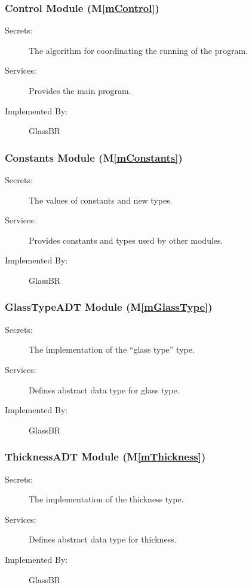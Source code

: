 \documentclass[12pt]{article}
\newcommand{\mref}[1]{M\ref{#1}}
\newcommand{\progname}{GlassBR}
\begin{document}
\subsubsection{Control Module (\mref{mControl})}

\begin{description}
\item[Secrets:] The algorithm for coordinating the running of the program.
\item[Services:] Provides the main program.
\item[Implemented By:] \progname{}
\end{description}

\subsubsection{Constants Module (\mref{mConstants})}

\begin{description}
\item[Secrets:] The values of constants and new types.
\item[Services:] Provides constants and types used by other modules.
\item[Implemented By:] \progname{}
\end{description}

\subsubsection{GlassTypeADT Module (\mref{mGlassType})}

\begin{description}
\item[Secrets:] The implementation of the ``glass type'' type.
\item[Services:] Defines abstract data type for glass type.
\item[Implemented By:] \progname{}
\end{description}

\subsubsection{ThicknessADT Module (\mref{mThickness})}

\begin{description}
\item[Secrets:] The implementation of the thickness type.
\item[Services:]  Defines abstract data type for thickness.
\item[Implemented By:] \progname{}
\end{description}
\end{document}
